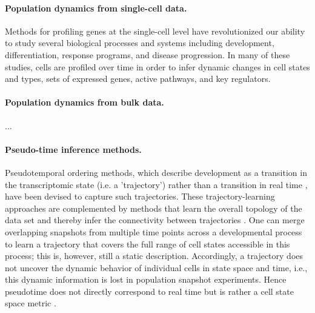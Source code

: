 \paragraph{Population dynamics from single-cell data.}

Methods for profiling genes at the single-cell level have revolutionized our ability to study several biological processes and systems including development, differentiation, response programs, and disease progression. In many of these studies, cells are profiled over time in order to infer dynamic changes in cell states and types, sets of expressed genes, active pathways, and key regulators.


\citep{fischer2019inferring, busch2015fundamental, hashimoto2016learning, raue2015data2dynamics}

\paragraph{Population dynamics from bulk data.}
...

\paragraph{Pseudo-time inference methods.}
Pseudotemporal ordering methods, which describe development as a transition in the transcriptomic state (i.e. a 'trajectory') rather than a transition in real time \citep{haghverdi2016diffusion, trapnell2014dynamics}, have been devised to capture such trajectories. These trajectory-learning approaches are complemented by methods that learn the overall topology of the data set and thereby infer the connectivity between trajectories \citep{qiu2017reversed, wolf2019paga, saelens2019comparison}. One can merge overlapping snapshots from multiple time points across a developmental process to learn a trajectory that covers the full range of cell states accessible in this process; this is, however, still a static description. Accordingly, a trajectory does not uncover the dynamic behavior of individual cells in state space and time, i.e., this dynamic information is lost in population snapshot experiments. Hence pseudotime does not directly correspond to real time but is rather a cell state space metric \citep{}.

